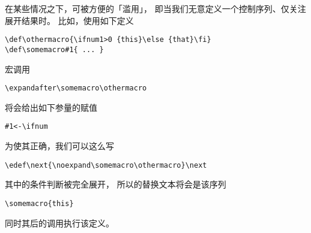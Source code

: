 \documentclass{book}
\begin{document}
在某些情况之下，可被方便的「滥用」，
即当我们无意定义一个控制序列、仅关注展开结果时。
比如，使用如下定义
\alt
\begin{verbatim}
\def\othermacro{\ifnum1>0 {this}\else {that}\fi}
\def\somemacro#1{ ... }
\end{verbatim}
宏调用
\begin{verbatim}
\expandafter\somemacro\othermacro 
\end{verbatim}
将会给出如下参量的赋值
\begin{verbatim}
#1<-\ifnum
\end{verbatim}
为使其正确，我们可以这么写
\begin{verbatim}
\edef\next{\noexpand\somemacro\othermacro}\next
\end{verbatim}
其中的条件判断被完全展开，
所以的替换文本将会是该序列
\begin{verbatim}
\somemacro{this}
\end{verbatim} 
同时其后的调用执行该定义。


\end{document}
